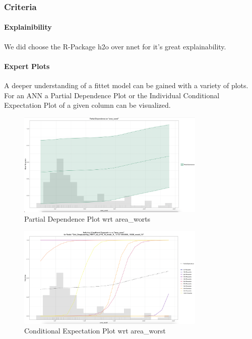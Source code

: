 \documentclass[]{article}
\let\oldparagraph\paragraph
\renewcommand{\paragraph}[1]{\oldparagraph{#1}\mbox{}}
\begin{document}
\subsubsection{Criteria}\label{criteria}

\paragraph{Explainibility}\label{explainibility}

We did choose the R-Package h2o over nnet for it's great explainability.

\paragraph{Expert Plots}\label{expert-plots}

A deeper understanding of a fittet model can be gained with a variety of
plots. For an ANN a Partial Dependence Plot or the Individual
Conditional Expectation Plot of a given column can be visualized.

\begin{figure}
    \centering
    \includegraphics[width=0.8\textwidth]{images/pd_plot.png}
    \caption{Partial Dependence Plot wrt area\_worts}
    \label{fig:pd_plot}
\end{figure}

\begin{figure}
    \centering
    \includegraphics[width=0.8\textwidth]{images/ice_plot.png}
    \caption{Conditional Expectation Plot wrt area\_worst}
    \label{fig:ice_plot}
\end{figure}
\end{document}
